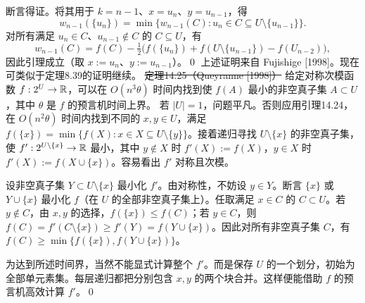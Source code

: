 断言得证。将其用于 $k=n-1$、$x=u_n$、$y=u_{n-1}$，得
\[w_{n-1}(\{u_n\})=\min\{w_{n-1}(C):u_n\in C\subseteq U\setminus\{u_{n-1}\}\}.\]
对所有满足 $u_n\in C$、$u_{n-1}\notin C$ 的 $C\subseteq U$，有
\[w_{n-1}(C)=f(C)-\tfrac12\bigl(f(\{u_n\})+f(U\setminus\{u_{n-1}\})-f(U_{n-2})\bigr),\]
因此引理成立（取 $x:=u_n$、$y:=u_{n-1}$）。\qed
上述证明来自 Fujishige [1998]。现在可类似于定理8.39的证明继续。
\st{定理14.25（Queyranne [1998]）} 给定对称次模函数 $f:2^U\to\mathbb R$，可以在 $O(n^3\theta)$ 时间内找到使 $f(A)$ 最小的非空真子集 $A\subset U$，其中 $\theta$ 是 $f$ 的预言机时间上界。
\pr 若 $|U|=1$，问题平凡。否则应用引理14.24，在 $O(n^2\theta)$ 时间内找到不同的 $x,y\in U$，满足 $f(\{x\})=\min\{f(X):x\in X\subseteq U\setminus\{y\}\}$。接着递归寻找 $U\setminus\{x\}$ 的非空真子集，使 $f':2^{U\setminus\{x\}}\to\mathbb R$ 最小，其中 $y\notin X$ 时 $f'(X):=f(X)$，$y\in X$ 时 $f'(X):=f(X\cup\{x\})$。容易看出 $f'$ 对称且次模。

设非空真子集 $Y\subset U\setminus\{x\}$ 最小化 $f'$。由对称性，不妨设 $y\in Y$。断言 $\{x\}$ 或 $Y\cup\{x\}$ 最小化 $f$（在 $U$ 的全部非空真子集上）。任取满足 $x\in C$ 的 $C\subset U$。若 $y\notin C$，由 $x,y$ 的选择，$f(\{x\})\le f(C)$；若 $y\in C$，则 $f(C)=f'(C\setminus\{x\})\ge f'(Y)=f(Y\cup\{x\})$。因此对所有非空真子集 $C$，有 $f(C)\ge\min\{f(\{x\}),f(Y\cup\{x\})\}$。

为达到所述时间界，当然不能显式计算整个 $f'$。而是保存 $U$ 的一个划分，初始为全部单元素集。每层递归都把分别包含 $x,y$ 的两个块合并。这样便能借助 $f$ 的预言机高效计算 $f'$。\qed

